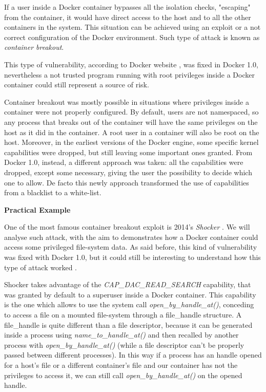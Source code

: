 \documentclass[a4paper,12pt]{article}
\begin{document}
If a user inside a Docker container bypasses all the isolation checks,
"escaping" from the container, it would have direct access to the host and to
all the other containers in the system. This situation can be achieved using an
exploit or a not correct configuration of the Docker environment. Such type of
attack is known as \textit{container breakout}.\par This type of vulnerability,
according to Docker website \cite{docker_blog_about_container_breakout}, was
fixed in Docker 1.0, nevertheless a not trusted program running with root
privileges inside a Docker container could still represent a source of risk.
\par Container breakout was mostly possible in situations where privileges
inside a container were not properly configured. By default, users are not
namespaced, so any process that breaks out of the container will have the same
privileges on the host as it did in the container. A root user in a container
will also be root on the host. Moreover, in the earliest versions of the Docker
engine, some specific kernel capabilities were dropped, but still leaving some
important ones granted. From Docker 1.0, instead, a different approach was
taken: all the capabilities were dropped, except some necessary, giving the user
the possibility to decide which one to allow. De facto this newly approach
transformed the use of capabilities from a blacklist to a white-list.

\bigbreak\textbf{Practical Example}\bigbreak 

One of the most famous container breakout exploit is 2014's
\textit{Shocker} \cite{shocker}. We will analyse such attack, with the aim to
demonstrates how a Docker container could access some privileged file-system
data. As said before, this kind of vulnerability was fixed with Docker 1.0, but
it could still be interesting to understand how this type of attack
worked \cite{shocker_how_it_works}.\par Shocker takes advantage of the
\textit{CAP\_DAC\_READ\_SEARCH} capability, that was granted by default to a
superuser inside a Docker container. This capability is the one which allows to
use the system call \textit{open\_by\_handle\_at()}, conceding to access a file
on a mounted file-system through a file\_handle structure. A file\_handle is
quite different than a file descriptor, because it can be generated inside a
process using \textit{name\_to\_handle\_at()} and then recalled by another
process with \textit{open\_by\_handle\_at()} (while a file descriptor can't be
properly passed between different processes). In this way if a process has an
handle opened for a host's file or a different container's file and our
container has not the privileges to access it, we can still call
\textit{open\_by\_handle\_at()} on the opened handle.
\end{document}
